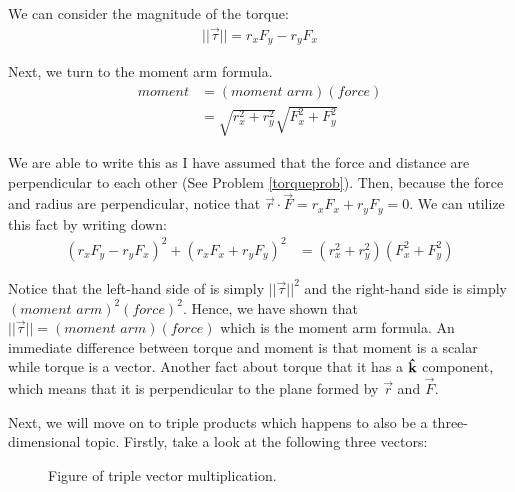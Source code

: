   We can consider the magnitude of the torque:
  \begin{align}
    ||\vec{\tau}|| = r_xF_y - r_yF_x
  \end{align}


  Next, we turn to the moment arm formula. 
  \begin{align*}
    \textit{moment} &= (\textit{moment arm})(\textit{force}) \\
                    &= \sqrt{r_x^2+r_y^2}\sqrt{F_x^2+F_y^2}
  \end{align*}


  We are able to write this as I have assumed that the force and distance are perpendicular to each other (See Problem \ref{torqueprob}). Then, because the force and radius are perpendicular, notice that \(\vec{r}\cdot \vec{F}=r_xF_x+r_yF_y=0\). We can utilize this fact by writing down:
  \begin{align}
    (r_xF_y-r_yF_x)^2 + (r_xF_x+r_yF_y)^2 &= (r_x^2+r_y^2)(F_x^2+F_y^2)
    \label{torque}
  \end{align}


  Notice that the left-hand side of  is simply \(||\vec{\tau}||^2\) and the right-hand side is simply \((\textit{moment arm})^2(\textit{force})^2\). Hence, we have shown that \(||\vec{\tau}|| = (\textit{moment arm})(\textit{force})\) which is the moment arm formula. An immediate difference between torque and moment is that moment is a scalar while torque is a vector. Another fact about torque that it has a \(\boldsymbol{\hat{\textbf{k}}}\) component, which means that it is perpendicular to the plane formed by \(\vec{r}\) and \(\vec{F}\). 


Next, we will move on to triple products which happens to also be a three-dimensional topic. Firstly, take a look at the following three vectors:
\begin{figure}[h]
  \centering
  \caption{Figure of triple vector multiplication.}
  \label{figtripvec}
\end{figure}


